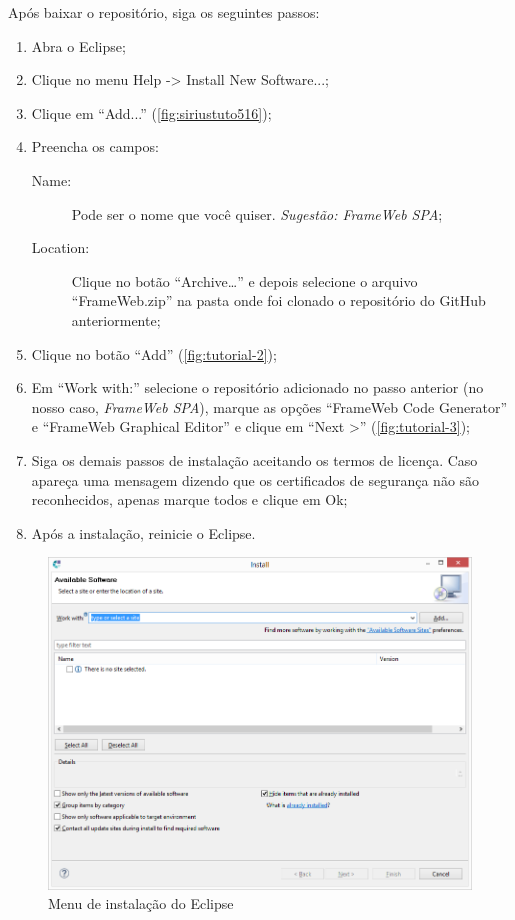 \documentclass[
article,			%
11pt,				%
oneside,			%
a4paper,			%
english,			%
brazil,				%
sumario=tradicional
]{abntex2}
\begin{document}
Após baixar o repositório, siga os seguintes passos:
\begin{enumerate}
	\item Abra o Eclipse;
	\item Clique no menu Help -> Install New Software...;
	\item Clique em ``Add...'' (\autoref{fig:siriustuto516});
	\item Preencha os campos:
	\begin{description}
		\item[Name:] Pode ser o nome que você quiser. \textit{Sugestão: FrameWeb SPA};
		\item[Location:] Clique no botão ``Archive…'' e depois selecione o arquivo ``FrameWeb.zip'' na pasta onde foi clonado o repositório do GitHub anteriormente;
	\end{description}
	\item Clique no botão ``Add'' (\autoref{fig:tutorial-2});
	\item Em ``Work with:'' selecione o repositório adicionado no passo anterior (no nosso caso, \textit{FrameWeb SPA}), marque as opções ``FrameWeb Code Generator'' e ``FrameWeb Graphical Editor'' e clique em ``Next >'' (\autoref{fig:tutorial-3});
	\item Siga os demais passos de instalação aceitando os termos de licença. Caso apareça uma mensagem dizendo que os certificados de segurança não são reconhecidos, apenas marque todos e clique em Ok;
	\item Após a instalação, reinicie o Eclipse.
\end{enumerate}

\begin{figure}
	\centering
	\includegraphics[width=0.7\linewidth]{figuras/Sirius_tuto5_16}
	\caption{Menu de instalação do Eclipse}
	\label{fig:siriustuto516}
\end{figure}
\end{document}
